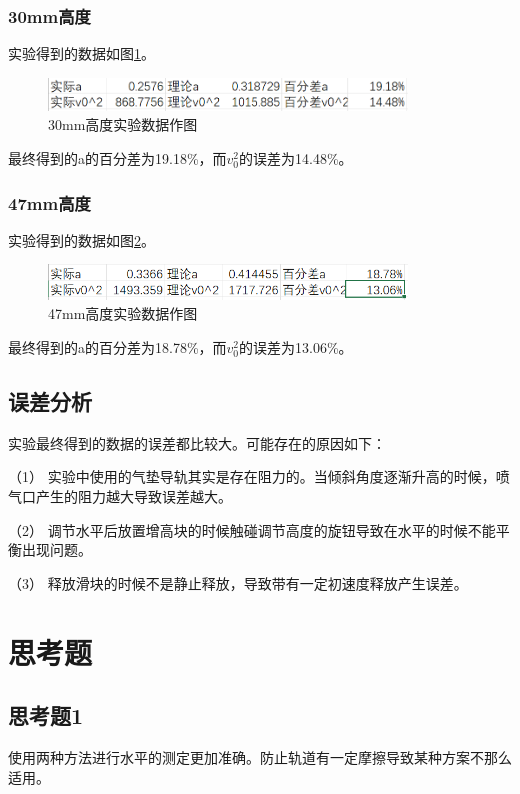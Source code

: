 \documentclass{ctexart}
\begin{document}
  \subsubsection{30mm高度}
  实验得到的数据如图\ref{30mm}。
  \begin{figure}[H]
    \centering
    \includegraphics[height=0.1\textheight,width=0.85\textwidth]{30mm.png}
    \caption{30mm高度实验数据作图}\label{30mm}
  \end{figure}
  最终得到的a的百分差为19.18\%，而$v_{0}^{2}$的误差为14.48\%。

  \subsubsection{47mm高度}
  实验得到的数据如图\ref{47mm}。
  \begin{figure}[H]
    \centering
    \includegraphics[height=0.1\textheight,width=0.85\textwidth]{47mm.png}
    \caption{47mm高度实验数据作图}\label{47mm}
  \end{figure}
  最终得到的a的百分差为18.78\%，而$v_{0}^{2}$的误差为13.06\%。

  \subsection{误差分析}
  实验最终得到的数据的误差都比较大。可能存在的原因如下：

  \noindent （1） \quad 实验中使用的气垫导轨其实是存在阻力的。当倾斜角度逐渐升高的时候，喷气口产生的阻力越大导致误差越大。

  \noindent （2） \quad 调节水平后放置增高块的时候触碰调节高度的旋钮导致在水平的时候不能平衡出现问题。

  \noindent （3） \quad 释放滑块的时候不是静止释放，导致带有一定初速度释放产生误差。

    
\section{思考题}
  \subsection{思考题1}
  使用两种方法进行水平的测定更加准确。防止轨道有一定摩擦导致某种方案不那么适用。
\end{document}
